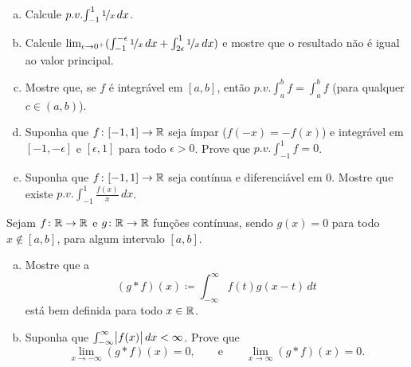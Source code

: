 \begin{exercise}
\leavevmode
\begin{enumerate}[a)]
\item
Calcule $p.v.\!\int_{-1}^1 \nicefrac{1}{x}\,dx$.
\item
Calcule
$\lim_{\epsilon\to 0^+}
( \int_{-1}^{-\epsilon} \nicefrac{1}{x}\,dx +
\int_{2\epsilon}^1 \nicefrac{1}{x}\,dx )$ e mostre que o resultado não é
igual ao valor principal.
\item
Mostre que, se $f$ é integrável em $[a,b]$, então
$p.v.\!\int_a^b f = \int_a^b f$ (para qualquer $c\in(a,b)$).
\item
Suponha que $f \colon [-1,1] \to {\mathbb{R}}$ seja ímpar ($f(-x)=-f(x)$) e
integrável em $[-1,-\epsilon]$ e $[\epsilon,1]$ para todo $\epsilon>0$.
Prove que
$p.v.\!\int_{-1}^1 f = 0$.
\item
Suponha que $f \colon [-1,1] \to {\mathbb{R}}$ seja contínua e diferenciável em 0.
Mostre que existe $p.v.\!\int_{-1}^1 \frac{f(x)}{x}\,dx$.
\end{enumerate}
\end{exercise}

\begin{samepage}
\begin{exercise}
Sejam $f \colon {\mathbb{R}} \to {\mathbb{R}}$ e $g \colon {\mathbb{R}} \to {\mathbb{R}}$ funções contínuas, sendo
$g(x)=0$ para todo $x\notin[a,b]$, para algum intervalo $[a,b]$.
\begin{enumerate}[a)]
\item
Mostre que a \emph{}
\begin{equation*}
(g * f)(x) \coloneqq \int_{-\infty}^\infty f(t)g(x-t)\,dt 
\end{equation*}
está bem definida para todo $x\in{\mathbb{R}}$.
\item
Suponha que $\int_{-\infty}^\infty \bigl\lvert {f(x)} \bigr\rvert\,dx < \infty$. Prove que
\begin{equation*}
\lim_{x \to -\infty} (g * f)(x) = 0, \qquad \text{e} \qquad
\lim_{x \to \infty} (g * f)(x) = 0 .
\end{equation*}
\end{enumerate}
\end{exercise}
\end{samepage}
